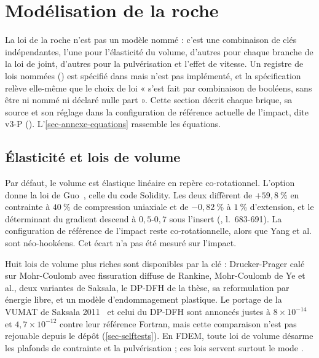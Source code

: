 \section{Modélisation de la roche}
\label{sec-materiau}

La loi de la roche n'est pas un modèle nommé : c'est une combinaison de clés indépendantes, l'une pour l'élasticité du volume, d'autres pour chaque branche de la loi de joint, d'autres pour la pulvérisation et l'effet de vitesse. Un registre de lois nommées () est spécifié dans  mais n'est pas implémenté, et la spécification relève elle-même que le choix de loi « s'est fait par combinaison de booléens, sans être ni nommé ni déclaré nulle part ». Cette section décrit chaque brique, sa source et son réglage dans la configuration de référence actuelle de l'impact, dite v3-P (). L'\cref{sec-annexe-equations} rassemble les équations.

\subsection{Élasticité et lois de volume}

Par défaut, le volume est élastique linéaire en repère co-rotationnel. L'option  donne la loi de Guo~\cite{guo2014thesis}, celle du code Solidity. Les deux diffèrent de $+59{,}8~\%$ en contrainte à $40~\%$ de compression uniaxiale et de $-0{,}82~\%$ à $1~\%$ d'extension, et le déterminant du gradient descend à $0{,}5$-$0{,}7$ sous l'insert (, l.~683-691). La configuration de référence de l'impact reste co-rotationnelle, alors que Yang et al. sont néo-hookéens. Cet écart n'a pas été mesuré sur l'impact.

Huit lois de volume plus riches sont disponibles par la clé  : Drucker-Prager calé sur Mohr-Coulomb avec fissuration diffuse de Rankine, Mohr-Coulomb de Ye et al., deux variantes de Saksala, le DP-DFH de la thèse, sa reformulation par énergie libre, et un modèle d'endommagement plastique. Le portage de la VUMAT de Saksala 2011~\cite{saksala2011ijnamg} et celui du DP-DFH sont annoncés justes à $8\times10^{-14}$ et $4{,}7\times10^{-12}$ contre leur référence Fortran, mais cette comparaison n'est pas rejouable depuis le dépôt (\cref{sec-selftests}). En FDEM, toute loi de volume désarme les plafonds de contrainte et la pulvérisation ; ces lois servent surtout le mode .

